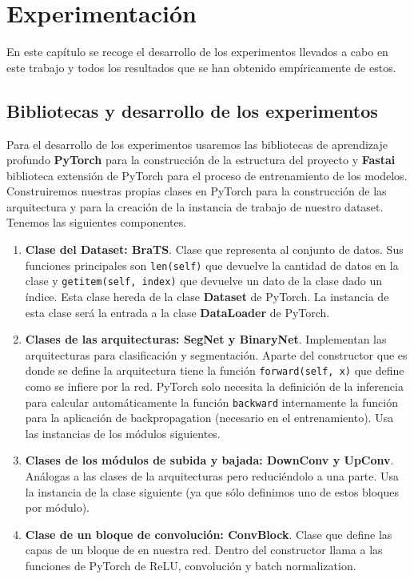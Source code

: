 \chapter{Experimentación}

En este capítulo se recoge el desarrollo de los experimentos llevados a cabo en este trabajo y todos los resultados que se han obtenido empíricamente de estos.

\section{Bibliotecas y desarrollo de los experimentos}

Para el desarrollo de los experimentos usaremos las bibliotecas de aprendizaje profundo \textbf{PyTorch} para la construcción de la estructura del proyecto y \textbf{Fastai} biblioteca extensión de PyTorch para el proceso de entrenamiento de los modelos. Construiremos nuestras propias clases en PyTorch para la construcción de las arquitectura y para la creación de la instancia de trabajo de nuestro dataset. Tenemos las siguientes componentes.

\begin{enumerate}
	\item \textbf{Clase del Dataset: BraTS}. Clase que representa al conjunto de datos. Sus funciones principales son \texttt{len(self)} que devuelve la cantidad de datos en la clase y \texttt{getitem(self, index)} que devuelve un dato de la clase dado un índice. Esta clase hereda de la clase \textbf{Dataset} de PyTorch.
	La instancia de esta clase será la entrada a la clase \textbf{DataLoader} de PyTorch.
	
	\item \textbf{Clases de las arquitecturas: SegNet y BinaryNet}. Implementan las arquitecturas para clasificación y segmentación. Aparte del constructor que es donde se define la arquitectura tiene la función \texttt{forward(self, x)} que define como se infiere por la red. PyTorch solo necesita la definición de la inferencia para calcular automáticamente la función \texttt{backward} internamente la función para la aplicación de backpropagation (necesario en el entrenamiento). Usa las instancias de los módulos siguientes.
	
	\item \textbf{Clases de los módulos de subida y bajada: DownConv y UpConv}. Análogas a las clases de la arquitecturas pero reduciéndolo a una parte. Usa la instancia de la clase siguiente (ya que sólo definimos uno de estos bloques por módulo).
	
	\item \textbf{Clase de un bloque de convolución: ConvBlock}. Clase que define las capas de un bloque de en nuestra red. Dentro del constructor llama a las funciones de PyTorch de ReLU, convolución y batch normalization.
	
\end{enumerate}

